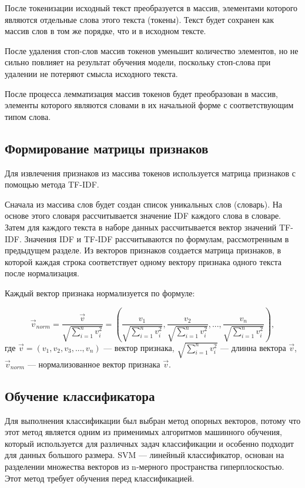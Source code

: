 После токенизации исходный текст преобразуется в массив, элементами которого являются отдельные слова этого текста (токены). Текст будет сохранен как массив слов в том же порядке, что и в исходном тексте.

После удаления стоп-слов массив токенов уменьшит количество элементов, но не сильно повлияет на результат обучения модели, поскольку стоп-слова при удалении не потеряют смысла исходного текста.

После процесса лемматизация массив токенов будет преобразован в массив, элементы которого являются словами в их начальной форме с соответствующим типом слова.

\subsection{Формирование матрицы признаков}

Для извлечения признаков из массива токенов используется матрица признаков с помощью метода TF-IDF.

Сначала из массива слов будет создан список уникальных слов (словарь). На основе этого словаря рассчитывается значение IDF каждого слова в словаре. Затем для каждого текста в наборе данных рассчитывается вектор значений TF-IDF. Значения IDF и TF-IDF рассчитываются по формулам, рассмотренным в предыдущем разделе. Из векторов признаков создается матрица признаков, в которой каждая строка соответствует одному вектору признака одного текста после нормализация.

Каждый вектор признака нормализуется по формуле:

\begin{equation}
    \vec v_{norm} = \frac{\vec v}{\sqrt{\sum_{i=1}^n v_i^2}} = (\frac{v_1}{\sqrt{\sum_{i=1}^n v_i^2}}, \frac{v_2}{\sqrt{\sum_{i=1}^n v_i^2}}, ..., \frac{v_n}{\sqrt{\sum_{i=1}^n v_i^2}}),
\end{equation}
где $\vec v = (v_1, v_2, v_3, ..., v_n)$ --- вектор признака, $\sqrt{\sum_{i=1}^n v_i^2}$ --- длинна вектора $\vec v$, $\vec v_{norm}$ --- нормализованное вектор признака $\vec v$.

\subsection{Обучение классификатора}

Для выполнения классификации был выбран метод опорных векторов, потому что этот метод является одним из применимых алгоритмов машинного обучения, который используется для различных задач классификации и особенно подходит для данных большого размера\cite{svm21}. SVM --- линейный классификатор, основан на разделении множества векторов из n-мерного пространства гиперплоскостью. Этот метод требует обучения перед классификацией.

